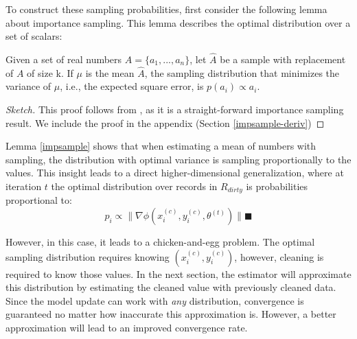 To construct these sampling probabilities, first consider the following lemma about importance sampling.
This lemma describes the optimal distribution over a set of scalars:
\begin{lemma}\label{impsample}
Given a set of real numbers $A = \{a_1,...,a_n\}$, let $\hat{A}$ be 
a sample with replacement of $A$ of size k.
If $\mu$ is the mean $\hat{A}$, the sampling distribution that minimizes
 the variance of $\mu$, i.e., the expected square error, is $p(a_i) \propto a_i$.
\end{lemma}
\begin{proof}[Sketch]
This proof follows from \cite{mcbook}, as it is a straight-forward importance sampling result.
We include the proof in the appendix (Section \ref{impsample-deriv})
\end{proof}

Lemma \ref{impsample} shows that when estimating a mean of numbers with sampling, the distribution with optimal variance is sampling proportionally to the values.
This insight leads to a direct higher-dimensional generalization, where at iteration $t$ the optimal distribution over records in $R_{dirty}$ is probabilities proportional to:
\[
p_i \propto \|\nabla\phi(x^{(c)}_i,y^{(c)}_i,\theta^{(t)})\| \blacksquare
\]

However, in this case, it leads to a chicken-and-egg problem.
The optimal sampling distribution requires knowing $(x^{(c)}_i,y^{(c)}_i)$, however, cleaning is required to know those values.
In the next section, the estimator will approximate this distribution by estimating the cleaned value with previously cleaned data.
Since the model update can work with \emph{any} distribution, convergence is guaranteed no matter how inaccurate this approximation is.
However, a better approximation will lead to an improved convergence rate.
